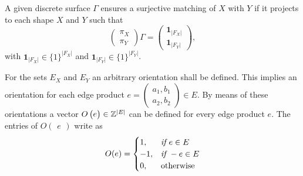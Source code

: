 \begin{definition}
	A given discrete surface $\Gamma$ ensures a surjective matching of $X$ with $Y$ if it projects to each shape $X$ and $Y$ such that
	\begin{equation}
			\begin{pmatrix}
			\pi_X \\ \pi_Y
		\end{pmatrix}
		\Gamma
		= 
		\begin{pmatrix}
			\boldsymbol{1}_{|F_X|} \\ \boldsymbol{1}_{|F_Y|}
		\end{pmatrix},
	\end{equation}
	with $\boldsymbol{1}_{|F_X|} \in \{1\}^{|F_X|}$ and $\boldsymbol{1}_{|F_Y|} \in \{1\}^{|F_Y|}$.
\end{definition}

\begin{definition}[Orientation]
	For the sets $E_X$ and $E_Y$ an arbitrary orientation shall be defined. This implies an orientation for each edge product $e = \begin{pmatrix} a_1,b_1 \\ a_2,b_2 \end{pmatrix} \in E$.
	By means of these orientations a vector $O\begin{pmatrix}e\end{pmatrix} \in \mathbb{Z}^{\lvert E\rvert}$ can be defined for every edge product $e$. The entries of $O\begin{pmatrix}e\end{pmatrix}$ write as
	\begin{equation}
		O(e) = \begin{cases}
			1,& \emph{if } e \in E\\
			-1,& \emph{if } -e \in E\\
			0,& \text{otherwise}
		\end{cases}
	\end{equation}
\end{definition}

